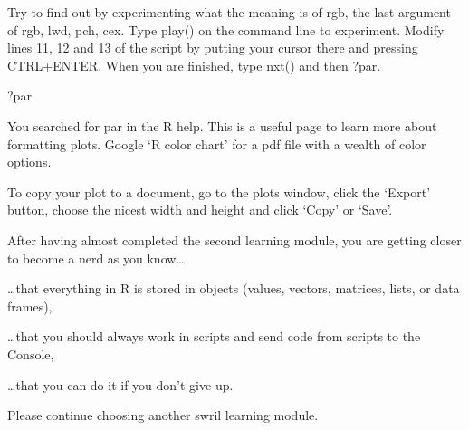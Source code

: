 \documentclass[
]{article}
\newenvironment{Shaded}{\begin{snugshade}}{\end{snugshade}}
\newcommand{\NormalTok}[1]{#1}
\begin{document}
Try to find out by experimenting what the meaning is of rgb, the last
argument of rgb, lwd, pch, cex. Type play() on the command line to
experiment. Modify lines 11, 12 and 13 of the script by putting your
cursor there and pressing CTRL+ENTER. When you are finished, type nxt()
and then ?par.

\begin{Shaded}
\begin{Highlighting}[]
\NormalTok{?par}
\end{Highlighting}
\end{Shaded}

You searched for par in the R help. This is a useful page to learn more
about formatting plots. Google `R color chart' for a pdf file with a
wealth of color options.

To copy your plot to a document, go to the plots window, click the
`Export' button, choose the nicest width and height and click `Copy' or
`Save'.

After having almost completed the second learning module, you are
getting closer to become a nerd as you know\ldots{}

\ldots that everything in R is stored in objects (values, vectors,
matrices, lists, or data frames),

\ldots that you should always work in scripts and send code from scripts
to the Console,

\ldots that you can do it if you don't give up.

Please continue choosing another swril learning module.
\end{document}
